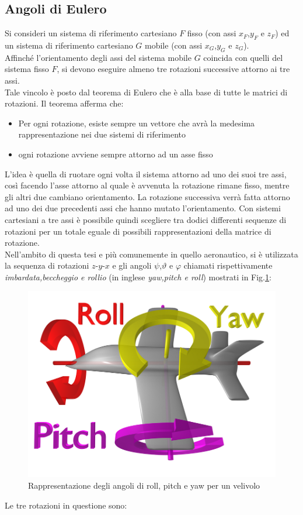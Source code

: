 \subsection{Angoli di Eulero}
Si consideri \cite{assetto2} un sistema di riferimento cartesiano $F$  fisso (con assi $x_F$,$y_F$ e $z_F$) ed un sistema di riferimento cartesiano $G$ mobile (con assi $x_G$,$y_G$ e $z_G$). \\
Affinché l'orientamento degli assi del sistema mobile $G$ coincida con quelli del sistema fisso $F$, si devono eseguire almeno tre rotazioni successive attorno ai tre assi.\\
Tale vincolo è posto dal teorema di Eulero che è alla base di tutte le matrici di rotazioni. Il teorema afferma che:
\begin{itemize}
	\item Per ogni rotazione, esiste sempre un vettore che avrà la medesima rappresentazione nei due sistemi di riferimento
	\item ogni rotazione avviene sempre attorno ad un asse fisso
\end{itemize} 
L'idea è quella di ruotare ogni volta il sistema attorno ad uno dei suoi tre assi, così facendo l'asse attorno al quale è avvenuta la rotazione rimane fisso, mentre gli altri due cambiano orientamento. La rotazione successiva verrà fatta attorno ad uno dei due precedenti assi che hanno mutato l'orientamento. Con sistemi cartesiani a tre assi è possibile quindi scegliere tra dodici differenti sequenze di rotazioni per un totale eguale di possibili rappresentazioni della matrice di rotazione.\\
Nell'ambito di questa tesi e più comunemente in quello aeronautico, si è utilizzata la sequenza di rotazioni $z$-$y$-$x$ e gli angoli $\psi$,$\vartheta$ e $\varphi$ chiamati rispettivamente \textit{imbardata,beccheggio e rollio} (in inglese \textit{yaw,pitch e roll}) mostrati in Fig.\ref{fig:rpy}:
\begin{figure}[H]  
	\centering 
	\includegraphics[scale=0.5]{elaborazione/rpy.png}
	\caption{Rappresentazione degli angoli di roll, pitch e yaw per un velivolo \cite{wikiRoll}}
	\label{fig:rpy}
\end{figure}
Le tre rotazioni in questione sono:

